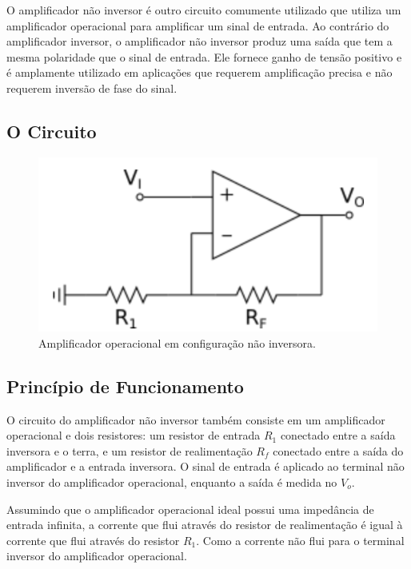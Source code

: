 \documentclass[12pt,twoside, a4paper, twocolumn]{article}
\begin{document}
O amplificador não inversor é outro circuito comumente utilizado que utiliza um amplificador operacional para amplificar um sinal de entrada. Ao contrário do amplificador inversor, o amplificador não inversor produz uma saída que tem a mesma polaridade que o sinal de entrada. Ele fornece ganho de tensão positivo e é amplamente utilizado em aplicações que requerem amplificação precisa e não requerem inversão de fase do sinal.


\subsection{O Circuito}


\begin{figure}[h]
    \centering
    \includegraphics[width=1\columnwidth]{images/opamp_naoinversor.png}
    \caption{Amplificador operacional em configuração não inversora.}
\end{figure}


\subsection{Princípio de Funcionamento}


O circuito do amplificador não inversor também consiste em um amplificador operacional e dois resistores: um resistor de entrada $R_1$ conectado entre a saída inversora e o terra, e um resistor de realimentação $R_f$ conectado entre a saída do amplificador e a entrada inversora. O sinal de entrada é aplicado ao terminal não inversor do amplificador operacional, enquanto a saída é medida no $V_o$.


Assumindo que o amplificador operacional ideal possui uma impedância de entrada infinita, a corrente que flui através do resistor de realimentação é igual à corrente que flui através do resistor $R_1$. Como a corrente não flui para o terminal inversor do amplificador operacional.
\end{document}
